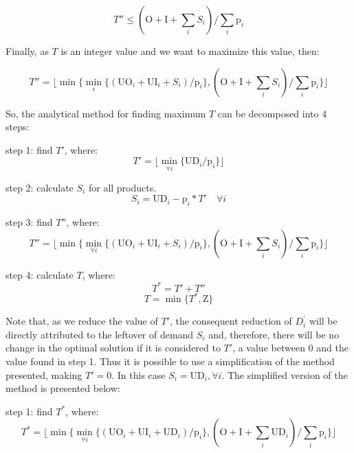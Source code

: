 \documentclass[authoryear,manuscript,12pt]{elsarticle}
\begin{document}
\begin{equation}
\label{eq:s14}
 T'' \leq (\textrm{O} + \textrm{I} + \sum_i S_i) / \sum_i \textrm{p}_i
\end{equation}

Finally, as $T$  is an integer value and we want to maximize this value, then:

\begin{equation}
\label{eq:s15}
 T'' = \lfloor\min\{\min_i\{ (\textrm{UO}_i + \textrm{UI}_i + S_i) / \textrm{p}_i\}, (\textrm{O} + \textrm{I} + \sum_i S_i) / \sum_i \textrm{p}_i \}\rfloor
\end{equation}

So, the analytical method for finding maximum $T$ can be decomposed into 4 steps:

step 1: find $T'$, where:
\begin{equation}
T' = \lfloor{\min_{\forall i} \{\textrm{UD}_i / \textrm{p}_i\}}\rfloor
\end{equation}

step 2: calculate $S_i$ for all products.
\begin{equation}
\label{eq:unmet}
S_i = \textrm{UD}_i - \textrm{p}_i * T' \quad \forall i
\end{equation}

step 3: find $T''$, where:
\begin{equation}
T'' = \lfloor{\min \{\min_{\forall i} \{(\textrm{UO}_i + \textrm{UI}_i + S_i) / \textrm{p}_i\},(\textrm{O} + \textrm{I} + \sum_i {S_i}) / \sum_i {\textrm{p}_i}\}}\rfloor
\end{equation}

step 4: calculate $T$, where: 
\begin{equation}
T^* = T' + T''
\end{equation}
\begin{equation}
T = \min \{T^* , \textrm{Z}\}
\end{equation}

Note that, as we reduce the value of $T'$, the consequent reduction of $D_{i}^{'}$ will be directly attributed to the leftover of demand $S_i$ and, therefore, there will be no change in the optimal solution if it is considered to $T'$, a value between 0 and the value found in step 1. Thus it is possible to use a simplification of the method presented, making $T' = 0$. In this case $S_i = \textrm{UD}_i, \forall i$. The simplified version of the method is presented below:

step 1: find $T^*$, where:
\begin{equation}
T^* = \lfloor{\min \{\min_{\forall i} \{(\textrm{UO}_i + \textrm{UI}_i + \textrm{UD}_i) / \textrm{p}_i\},(\textrm{O} + \textrm{I} + \sum_i \textrm{UD}_i) / \sum_i {\textrm{p}_i}\}}\rfloor
\end{equation}
\end{document}
